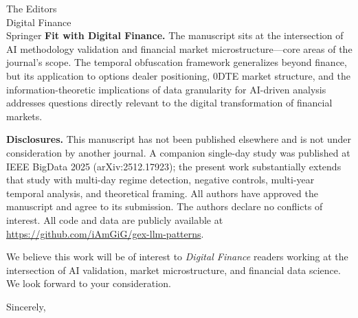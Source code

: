 \documentclass[11pt]{letter}
\begin{document}
\begin{letter}{The Editors \\ Digital Finance \\ Springer}
\textbf{Fit with Digital Finance.}
The manuscript sits at the intersection of AI methodology validation and financial market microstructure---core areas of the journal's scope. The temporal obfuscation framework generalizes beyond finance, but its application to options dealer positioning, 0DTE market structure, and the information-theoretic implications of data granularity for AI-driven analysis addresses questions directly relevant to the digital transformation of financial markets.

\textbf{Disclosures.}
This manuscript has not been published elsewhere and is not under consideration by another journal. A companion single-day study was published at IEEE BigData 2025 (arXiv:2512.17923); the present work substantially extends that study with multi-day regime detection, negative controls, multi-year temporal analysis, and theoretical framing. All authors have approved the manuscript and agree to its submission. The authors declare no conflicts of interest. All code and data are publicly available at \url{https://github.com/iAmGiG/gex-llm-patterns}.

We believe this work will be of interest to \textit{Digital Finance} readers working at the intersection of AI validation, market microstructure, and financial data science. We look forward to your consideration.

\closing{Sincerely,}

\end{letter}
\end{document}
